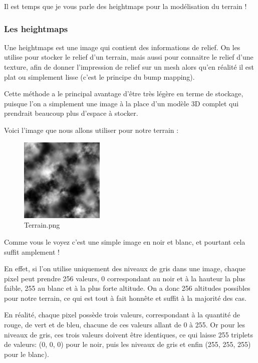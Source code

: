 Il est temps que je vous parle des heightmaps pour la modélisation du terrain !


\subsubsection{Les heightmaps}

Une heightmaps est une image qui contient des informations de relief. On les utilise pour stocker le relief d'un terrain, mais aussi pour connaitre le relief d'une texture, afin de donner l'impression de relief sur un mesh alors qu'en réalité il est plat ou simplement lisse (c'est le principe du bump mapping).

Cette méthode a le principal avantage d'être très légère en terme de stockage, puisque l'on a simplement une image à la place d'un modèle 3D complet qui prendrait beaucoup plus d'espace à stocker.

Voici l'image que nous allons utiliser pour notre terrain :
\begin{figure}[hbtp]
\caption{Terrain.png}
\centering
\includegraphics[width=4cm]{Ogre/1_Base_de_Ogre/5_Garder_les_pieds_sur_terre/images/terrain.png} %
\end{figure}

Comme vous le voyez c'est une simple image en noir et blanc, et pourtant cela suffit amplement !

En effet, si l'on utilise uniquement des niveaux de gris dans une image, chaque pixel peut prendre 256 valeurs, 0 correspondant au noir et à la hauteur la plus faible, 255 au blanc et à la plus forte altitude. On a donc 256 altitudes possibles pour notre terrain, ce qui est tout à fait honnête et suffit à la majorité des cas.

En réalité, chaque pixel possède trois valeurs, correspondant à la quantité de rouge, de vert et de bleu, chacune de ces valeurs allant de 0 à 255. Or pour les niveaux de gris, ces trois valeurs doivent être identiques, ce qui laisse 255 triplets de valeurs: (0, 0, 0) pour le noir, puis les niveaux de gris et enfin (255, 255, 255) pour le blanc).

